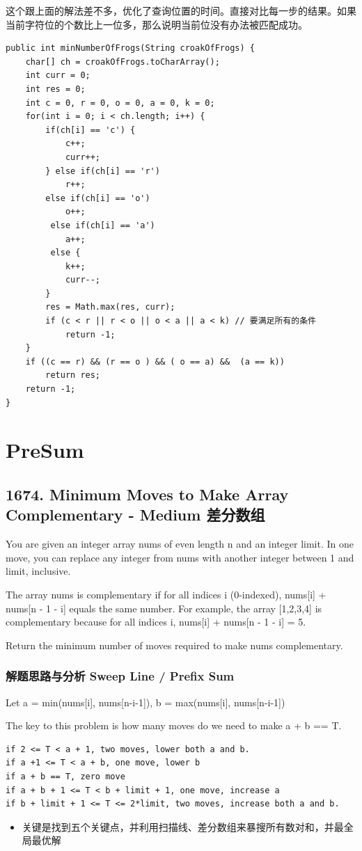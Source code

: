 \documentclass[9pt, b5paaper]{book}
\begin{document}
这个跟上面的解法差不多，优化了查询位置的时间。直接对比每一步的结果。如果当前字符位的个数比上一位多，那么说明当前位没有办法被匹配成功。

\begin{verbatim}
public int minNumberOfFrogs(String croakOfFrogs) {
    char[] ch = croakOfFrogs.toCharArray();
    int curr = 0;
    int res = 0;
    int c = 0, r = 0, o = 0, a = 0, k = 0;
    for(int i = 0; i < ch.length; i++) {
        if(ch[i] == 'c') {
            c++;
            curr++;
        } else if(ch[i] == 'r') 
            r++;
        else if(ch[i] == 'o') 
            o++;
         else if(ch[i] == 'a') 
            a++;
         else {
            k++; 
            curr--;
        }
        res = Math.max(res, curr);
        if (c < r || r < o || o < a || a < k) // 要满足所有的条件
            return -1;
    }
    if ((c == r) && (r == o ) && ( o == a) &&  (a == k)) 
        return res;
    return -1;
}
\end{verbatim}


\chapter{PreSum}
\label{sec-20}
\section{1674. Minimum Moves to Make Array Complementary - Medium 差分数组}
\label{sec-20-1}
You are given an integer array nums of even length n and an integer limit. In one move, you can replace any integer from nums with another integer between 1 and limit, inclusive.

The array nums is complementary if for all indices i (0-indexed), nums[i] + nums[n - 1 - i] equals the same number. For example, the array [1,2,3,4] is complementary because for all indices i, nums[i] + nums[n - 1 - i] = 5.

Return the minimum number of moves required to make nums complementary.
\subsection{解题思路与分析 Sweep Line / Prefix Sum}
\label{sec-20-1-1}
Let a = min(nums[i], nums[n-i-1]), b = max(nums[i], nums[n-i-1])

The key to this problem is how many moves do we need to make a + b == T.
\begin{verbatim}
if 2 <= T < a + 1, two moves, lower both a and b.
if a +1 <= T < a + b, one move, lower b
if a + b == T, zero move
if a + b + 1 <= T < b + limit + 1, one move, increase a
if b + limit + 1 <= T <= 2*limit, two moves, increase both a and b.
\end{verbatim}
\begin{itemize}
\item 关键是找到五个关键点，并利用扫描线、差分数组来暴搜所有数对和，并最全局最优解
\end{itemize}
\end{document}

